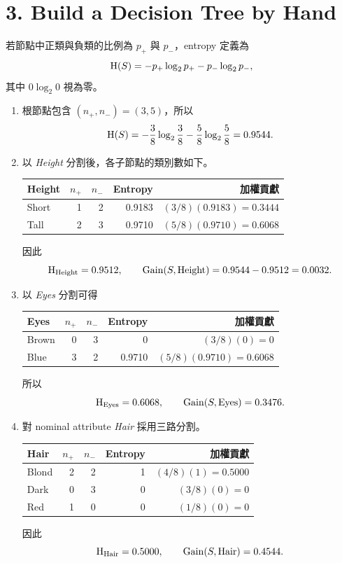 \section*{3. Build a Decision Tree by Hand}

若節點中正類與負類的比例為 $p_+$ 與 $p_-$，entropy 定義為
\[
  \operatorname{H}(S)=-p_+\log_2p_+-p_-\log_2p_-,
\]
其中 $0\log_2 0$ 視為零。

\begin{enumerate}
  \item 根節點包含 $(n_+,n_-)=(3,5)$，所以
  \[
    \operatorname{H}(S)=-\frac38\log_2\frac38-\frac58\log_2\frac58
    =0.9544.
  \]

  \item 以 \emph{Height} 分割後，各子節點的類別數如下。
  \begin{center}
  \begin{tabular}{lrrrr}
    \toprule
    Height & $n_+$ & $n_-$ & Entropy & 加權貢獻 \\
    \midrule
    Short & 1 & 2 & 0.9183 & $(3/8)(0.9183)=0.3444$ \\
    Tall  & 2 & 3 & 0.9710 & $(5/8)(0.9710)=0.6068$ \\
    \bottomrule
  \end{tabular}
  \end{center}
  因此
  \[
    \operatorname{H}_{\text{Height}}=0.9512,
    \qquad \operatorname{Gain}(S,\text{Height})=0.9544-0.9512=0.0032.
  \]

  \item 以 \emph{Eyes} 分割可得
  \begin{center}
  \begin{tabular}{lrrrr}
    \toprule
    Eyes & $n_+$ & $n_-$ & Entropy & 加權貢獻 \\
    \midrule
    Brown & 0 & 3 & 0      & $(3/8)(0)=0$ \\
    Blue  & 3 & 2 & 0.9710 & $(5/8)(0.9710)=0.6068$ \\
    \bottomrule
  \end{tabular}
  \end{center}
  所以
  \[
    \operatorname{H}_{\text{Eyes}}=0.6068,
    \qquad \operatorname{Gain}(S,\text{Eyes})=0.3476.
  \]

  \item 對 nominal attribute \emph{Hair} 採用三路分割。
  \begin{center}
  \begin{tabular}{lrrrr}
    \toprule
    Hair & $n_+$ & $n_-$ & Entropy & 加權貢獻 \\
    \midrule
    Blond & 2 & 2 & 1 & $(4/8)(1)=0.5000$ \\
    Dark  & 0 & 3 & 0 & $(3/8)(0)=0$ \\
    Red   & 1 & 0 & 0 & $(1/8)(0)=0$ \\
    \bottomrule
  \end{tabular}
  \end{center}
  因此
  \[
    \operatorname{H}_{\text{Hair}}=0.5000,
    \qquad \operatorname{Gain}(S,\text{Hair})=0.4544.
  \]


\end{enumerate}
